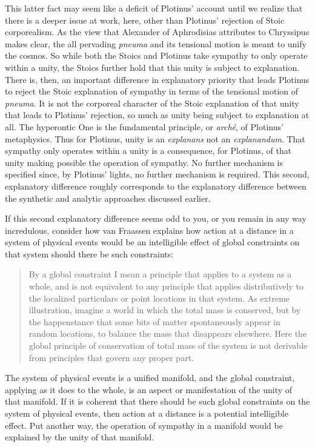 This latter fact may seem like a deficit of Plotinus' account until we realize that there is a deeper issue at work, here, other than Plotinus' rejection of Stoic corporealism. As the view that Alexander of Aphrodisias attributes to Chryssipus makes clear, the all pervading \emph{pneuma} and its tensional motion is meant to unify the cosmos. So while both the Stoics and Plotinus take sympathy to only operate within a unity, the Stoics further hold that this unity is subject to explanation. There is, then, an important difference in explanatory priority that leads Plotinus to reject the Stoic explanation of sympathy in terms of the tensional motion of \emph{pneuma}. It is not the corporeal character of the Stoic explanation of that unity that leads to Plotinus' rejection, so much as unity being subject to explanation at all. The hyperontic One is the fundamental principle, or \emph{arch\'{e}}, of Plotinus' metaphysics. Thus for Plotinus, unity is an \emph{explanans} not an \emph{explanandum}. That sympathy only operates within a unity is a consequence, for Plotinus, of that unity making possible the operation of sympathy. No further mechanism is specified since, by Plotinus' lights, no further mechanism is required. This second, explanatory difference roughly corresponds to the explanatory difference between the synthetic and analytic approaches discussed earlier.

If this second explanatory difference seems odd to you, or you remain in any way incredulous, consider how van Fraassen explains how action at a distance in a system of physical events would be an intelligible effect of global constraints on that system should there be such constraints:
\begin{quote}
	By a global constraint I mean a principle that applies to a system as a whole, and is not equivalent to any principle that applies distributively to the localized particulars or point locations in that system. As extreme illustration, imagine a world in which the total mass is conserved, but by the happenstance that some bits of matter spontaneously appear in random locations, to balance the mass that disappears elsewhere. Here the global principle of conservation of total mass of the system is not derivable from principles that govern any proper part. \citep[3]{Fraassen:1989ao}
\end{quote}
The system of physical events is a unified manifold, and the global constraint, applying as it does to the whole, is an aspect or manifestation of the unity of that manifold. If it is coherent that there should be such global constraints on the system of physical events, then action at a distance is a potential intelligible effect. Put another way, the operation of sympathy in a manifold would be explained by the unity of that manifold.

